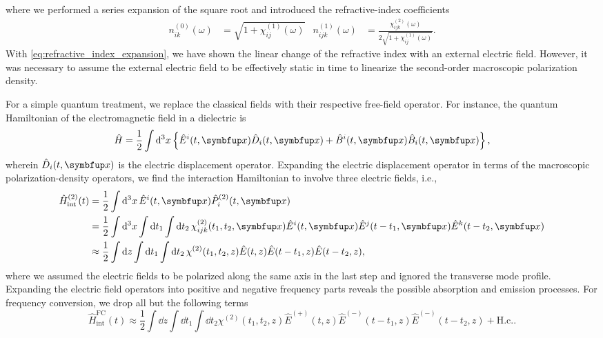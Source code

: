 where we performed a series expansion of the square root and introduced the refractive-index coefficients~\cite{Rerat2020}
\begin{align}
	n^{(0)}_{ik}(\omega)
	&=
	\sqrt{1+\chi_{ij}^{(1)}(\omega)}
	&
	n^{(1)}_{ijk}(\omega)
	&=
	\frac{\chi^{(2)}_{ijk}(\omega)}{2\sqrt{1+\chi^{(1)}_{ij}(\omega)}}
	.
\end{align}
With \cref{eq:refractive_index_expansion}, we have shown the linear change of the refractive index with an external electric field.
However, it was necessary to assume the external electric field to be effectively static in time to linearize the second-order macroscopic polarization density.

For a simple quantum treatment, we replace the classical fields with their respective free-field operator.
For instance, the quantum Hamiltonian of the electromagnetic field in a dielectric is~\cite[p.~124]{Jackson2007}
\begin{equation}
	\hat{H}
	=
	\frac{1}{2}
	\int\dd[3]{x}
	\left\{
		\hat{E}^i(t,\vb{x})
		\hat{D}_i(t,\vb{x})
		+
		\hat{B}^i(t,\vb{x})
		\hat{B}_i(t,\vb{x})
	\right\}
	,
\end{equation}
wherein $\hat{D}_i(t,\vb{x})$ is the electric displacement operator.
Expanding the electric displacement operator in terms of the macroscopic polarization-density operators, we find the interaction Hamiltonian to involve three electric fields, i.e.,
\begin{equation}
	\begin{split}
		\hat{H}_\text{int}^{(2)}(t)
		&=
		\frac{1}{2}
		\int\dd[3]{x}
		\hat{E}^i(t,\vb{x})
		\hat{P}_i^{(2)}(t,\vb{x})
		\\
		&=
		\frac{1}{2}
		\int\dd[3]{x}
		\int\dd{t_1}
		\int\dd{t_2}
		\chi^{(2)}_{ijk}(t_1,t_2,\vb{x})
		\hat{E}^i(t,\vb{x})
		\hat{E}^j(t-t_1,\vb{x})
		\hat{E}^k(t-t_2,\vb{x})
		\\
		&\approx
		\frac{1}{2}
		\int\dd{z}
		\int\dd{t_1}
		\int\dd{t_2}
		\chi^{(2)}(t_1,t_2,z)
		\hat{E}(t,z)
		\hat{E}(t-t_1,z)
		\hat{E}(t-t_2,z)
		,
	\end{split}
\end{equation}
where we assumed the electric fields to be polarized along the same axis in the last step and ignored the transverse mode profile.
Expanding the electric field operators into positive and negative frequency parts reveals the possible absorption and emission processes.
For frequency conversion, we drop all but the following terms
\begin{equation}
	\hat{H}_\text{int}^\text{FC}(t)
	\approx
	\frac{1}{2}
	\int\dd{z}
	\int\dd{t_1}
	\int\dd{t_2}
	\chi^{(2)}(t_1,t_2,z)
	\hat{E}^{(+)}(t,z)
	\hat{E}^{(-)}(t-t_1,z)
	\hat{E}^{(-)}(t-t_2,z)
	+
	\text{H.c.}
	.
\end{equation}
